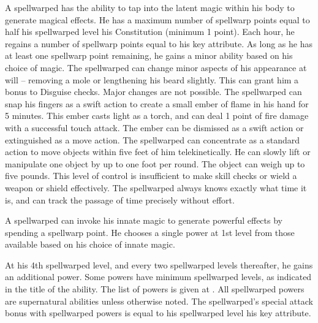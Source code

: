  A spellwarped has the ability to tap into the latent magic within his body to generate magical effects. He has a maximum number of spellwarp points equal to half his spellwarped level \add his Constitution (minimum 1 point). Each hour, he regains a number of spellwarp points equal to his key attribute. As long as he has at least one spellwarp point remaining, he gains a minor ability based on his choice of magic.
 The spellwarped can change minor aspects of his appearance at will -- removing a mole or lengthening his beard slightly. This can grant him a  bonus to Disguise checks. Major changes are not possible.
 The spellwarped can snap his fingers as a swift action to create a small ember of flame in his hand for 5 minutes. This ember casts light as a torch, and can deal 1 point of fire damage with a successful touch attack. The ember can be dismissed as a swift action or extinguished as a move action.
 The spellwarped can concentrate as a standard action to move objects within five feet of him telekinetically. He can slowly lift or manipulate one object by up to one foot per round. The object can weigh up to five pounds. This level of control is insufficient to make skill checks or wield a weapon or shield effectively.
 The spellwarped always knows exactly what time it is, and can track the passage of time precisely without effort.

 A spellwarped can invoke his innate magic to generate powerful effects by spending a spellwarp point. He chooses a single power at 1st level from those available based on his choice of innate magic.

At his 4th spellwarped level, and every two spellwarped levels thereafter, he gains an additional power. Some powers have minimum spellwarped levels, as indicated in the title of the ability. The list of powers is given at . All spellwarped powers are supernatural abilities unless otherwise noted. The spellwarped's special attack bonus with spellwarped powers is equal to his spellwarped level \add his key attribute.

